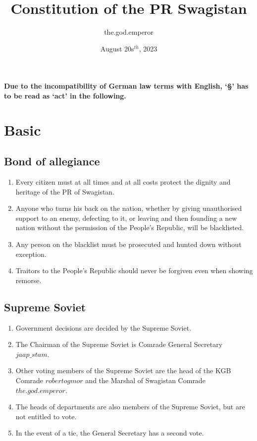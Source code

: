 \documentclass{article}
\title{Constitution of the PR Swagistan}
\author{the.god.emperor}
\date{August 20s$^{th}$, 2023}
\begin{document}
\maketitle
\newpage
\tableofcontents
\newpage
\paragraph*{Due to the incompatibility of German law terms with English, `§' has to be read as `act' in the following.}

\section{Basic}
\subsection{Bond of allegiance}
\begin{enumerate}[(1)]
    \item Every citizen must at all times and at all costs protect the dignity and heritage of the PR of Swagistan.
    \item Anyone who turns his back on the nation, whether by giving unauthorised support to an enemy, defecting to it, or leaving and then founding a new nation without the permission of the People's Republic, will be blacklisted.
    \item Any person on the blacklist must be prosecuted and hunted down without exception.
    \item Traitors to the People's Republic should never be forgiven even when showing remorse.
\end{enumerate}

\subsection{Supreme Soviet}
\begin{enumerate}[(1)]
    \item Government decisions are decided by the Supreme Soviet.
    \item The Chairman of the Supreme Soviet is Comrade General Secretary $jaap\_stam$.
    \item Other voting members of the Supreme Soviet are the head of the KGB Comrade $robertogmor$ and the Marshal of Swagistan Comrade $the.god.emperor$.
    \item The heads of departments are also members of the Supreme Soviet, but are not entitled to vote.
    \item In the event of a tie, the General Secretary has a second vote.
\end{enumerate}
\end{document}
